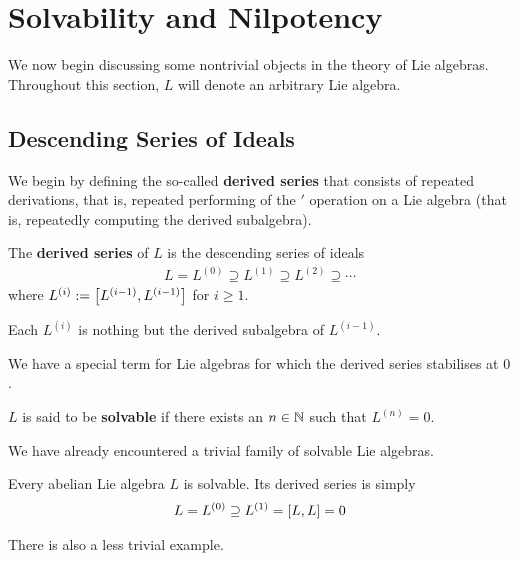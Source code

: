 \section{Solvability and Nilpotency}

We now begin discussing some nontrivial objects in the theory of Lie algebras. Throughout this section, $L$ will denote an arbitrary Lie algebra.

\subsection{Descending Series of Ideals}

We begin by defining the so-called \textbf{derived series} that consists of repeated derivations, that is, repeated performing of the $'$ operation on a Lie algebra (that is, repeatedly computing the derived subalgebra).

\begin{boxdefinition}
    The \textbf{derived series} of $L$ is the descending series of ideals
    \begin{align*}
        L = L^{(0)} \supseteq L^{(1)} \supseteq L^{(2)} \supseteq \cdots %
    \end{align*}
    where $L^{(i)} := \left[ L^{(i - 1)}, L^{(i-1)} \right]$ for $i \geq 1$. %
\end{boxdefinition}

Each $L^{(i)}$ is nothing but the derived subalgebra of $L^{(i - 1)}$.

We have a special term for Lie algebras for which the derived series stabilises at $0$.

\begin{boxdefinition}[Solvability]
    $L$ is said to be \textbf{solvable} if there exists an $n \in \mathbb{N}$ such that $L^{(n)} = 0$.
\end{boxdefinition}

We have already encountered a trivial family of solvable Lie algebras.

\begin{boxexample}
    Every abelian Lie algebra $L$ is solvable. Its derived series is simply
    \begin{align*}
        L = L^{(0)} \supseteq L^{(1)} = \left[ L, L \right] = 0
    \end{align*}
\end{boxexample}

There is also a less trivial example.

